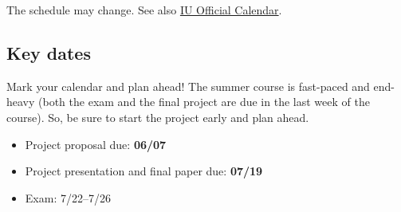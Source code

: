 \documentclass[11pt,article,oneside]{memoir} %
\begin{document}
The schedule may change. See also \href{https://registrar.indiana.edu/official-calendar/index.shtml}{IU Official Calendar}. 

\subsection{Key dates}\label{sub:key_dates} %

Mark your calendar and plan ahead! 
The summer course is fast-paced and end-heavy (both the exam and the final project are due in the last week of the course).
So, be sure to start the project early and plan ahead. 

\begin{itemize}%
\item Project proposal due: \textbf{06/07}
\item Project presentation and final paper due: \textbf{07/19}
\item Exam: 7/22--7/26
\end{itemize} %


%

\end{document}
